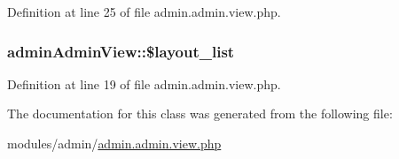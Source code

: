 Definition at line 25 of file admin.\+admin.\+view.\+php.

\hypertarget{classadminAdminView_a3655428ad4a88938daaa0a44c1ff96ea}{
\subsubsection[{\$layout\+\_\+list}]{\setlength{\rightskip}{0pt plus 5cm}admin\+Admin\+View\+::\$layout\+\_\+list}}\label{classadminAdminView_a3655428ad4a88938daaa0a44c1ff96ea}


Definition at line 19 of file admin.\+admin.\+view.\+php.



The documentation for this class was generated from the following file\+:\begin{DoxyCompactItemize}
\item 
modules/admin/\hyperlink{admin_8admin_8view_8php}{admin.\+admin.\+view.\+php}\end{DoxyCompactItemize}
